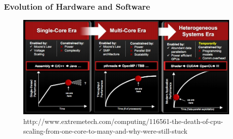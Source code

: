 \documentclass[12pt]{beamer}
\begin{document}
\begin{frame}
\frametitle{Evolution of Hardware and Software}
\begin{figure}
\includegraphics[width=\textwidth]{img/amdscaling.jpg}
\caption{http://www.extremetech.com/computing/116561-the-death-of-cpu-scaling-from-one-core-to-many-and-why-were-still-stuck}
\end{figure}
\end{frame}
\end{document}
